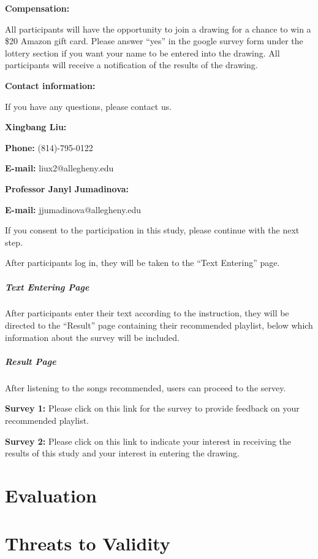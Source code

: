 \begin{displayquote}
  \textbf{Compensation:}

  All participants will have the opportunity to join a drawing for a chance to
  win a \$20 Amazon gift card. Please answer “yes” in the google survey form under
  the lottery section if you want your name to be entered into the drawing. All
  participants will receive a notification of the results of the drawing.

  \textbf{Contact information:}

  If you have any questions, please contact us.

  \textbf{Xingbang Liu:}

  \textbf{Phone:} (814)-795-0122

  \textbf{E-mail:} liux2@allegheny.edu

  \textbf{Professor Janyl Jumadinova:}

  \textbf{E-mail:} jjumadinova@allegheny.edu

  If you consent to the participation in this study, please continue with the
  next step.
\end{displayquote}

After participants log in, they will be taken to the “Text Entering” page.

\subparagraph{Text Entering Page}

After participants enter their text according to the instruction, they will be
directed to the “Result” page containing their recommended playlist, below which
information about the survey will be included.

\subparagraph{Result Page}

After listening to the songs recommended, users can proceed to the servey.

\begin{displayquote}
  \textbf{Survey 1:} Please click on this link for the survey to provide feedback
  on your recommended playlist.

  \textbf{Survey 2:} Please click on this link to indicate your interest in receiving
  the results of this study and your interest in entering the drawing.
\end{displayquote}

\section{Evaluation}

\section{Threats to Validity}
